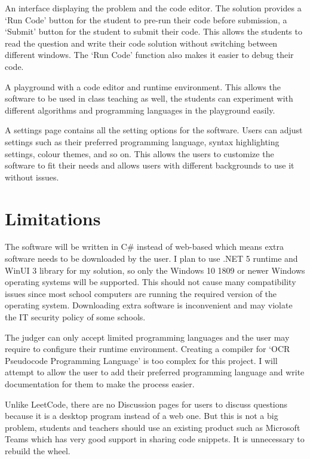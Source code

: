 \documentclass[a4paper]{report}
\begin{document}
An interface displaying the problem and the code editor. The solution provides a `Run Code' button for the student to pre-run their code before submission, a `Submit' button for the student to submit their code. This allows the students to read the question and write their code solution without switching between different windows. The `Run Code' function also makes it easier to debug their code.

A playground with a code editor and runtime environment. This allows the software to be used in class teaching as well, the students can experiment with different algorithms and programming languages in the playground easily.

A settings page contains all the setting options for the software. Users can adjust settings such as their preferred programming language, syntax highlighting settings, colour themes, and so on. This allows the users to customize the software to fit their needs and allows users with different backgrounds to use it without issues.

\section{Limitations}

The software will be written in C\# instead of web-based which means extra software needs to be downloaded by the user. I plan to use .NET 5 runtime and WinUI 3 library for my solution, so only the Windows 10 1809 or newer Windows operating systems will be supported. This should not cause many compatibility issues since most school computers are running the required version of the operating system. Downloading extra software is inconvenient and may violate the IT security policy of some schools.

The judger can only accept limited programming languages and the user may require to configure their runtime environment. Creating a compiler for `OCR Pseudocode Programming Language' is too complex for this project. I will attempt to allow the user to add their preferred programming language and write documentation for them to make the process easier.

Unlike LeetCode, there are no Discussion pages for users to discuss questions because it is a desktop program instead of a web one. But this is not a big problem, students and teachers should use an existing product such as Microsoft Teams which has very good support in sharing code snippets. It is unnecessary to rebuild the wheel.
\end{document}
